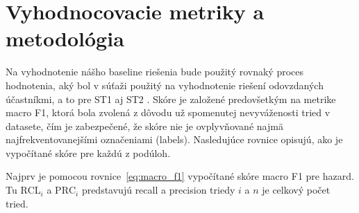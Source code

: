 \section{Vyhodnocovacie metriky a metodológia}

Na vyhodnotenie nášho baseline riešenia bude použitý rovnaký proces hodnotenia, aký bol v súťaži použitý na vyhodnotenie riešení odovzdaných účastníkmi, a to pre ST1 aj ST2 \cite{randl-etal-2025-semeval}. Skóre je založené predovšetkým na metrike macro F1, ktorá bola zvolená z dôvodu už spomenutej nevyváženosti tried v datasete, čím je zabezpečené, že skóre nie je ovplyvňované najmä najfrekventovanejšími označeniami (labels). Nasledujúce rovnice opisujú, ako je vypočítané skóre pre každú z podúloh.

Najprv je pomocou rovnice~\ref{eq:macro_f1} vypočítané skóre macro F1 pre hazard. Tu $\mathrm{RCL}_i$ a $\mathrm{PRC}_i$ predstavujú recall a precision triedy $i$ a $n$ je celkový počet tried.

